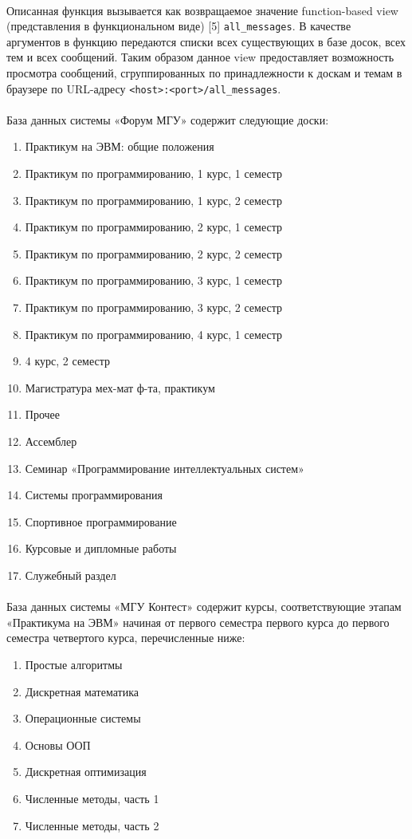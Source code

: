 \documentclass[12pt, a4paper, oneside]{article}
\begin{document}
\paragraph{}
Описанная функция вызывается как возвращаемое значение function-based view (представления в функциональном виде) [5] \texttt{all\_messages}. В качестве аргументов в функцию передаются списки всех существующих в базе досок, всех тем и всех сообщений. Таким образом данное view предоставляет возможность просмотра сообщений, сгруппированных по принадлежности к доскам и темам в браузере по URL-адресу \texttt{<host>:<port>/all\_messages}.
\paragraph{}
База данных системы «Форум МГУ» содержит следующие доски:
\begin{enumerate}
    \item Практикум на ЭВМ: общие положения
    \item Практикум по программированию, 1 курс, 1 семестр
    \item Практикум по программированию, 1 курс, 2 семестр
    \item Практикум по программированию, 2 курс, 1 семестр
    \item Практикум по программированию, 2 курс, 2 семестр
    \item Практикум по программированию, 3 курс, 1 семестр
    \item Практикум по программированию, 3 курс, 2 семестр
    \item Практикум по программированию, 4 курс, 1 семестр
    \item 4 курс, 2 семестр
    \item Магистратура мех-мат ф-та, практикум
    \item Прочее
    \item Ассемблер
    \item Семинар «Программирование интеллектуальных систем»
    \item Системы программирования
    \item Спортивное программирование
    \item Курсовые и дипломные работы
    \item Служебный раздел
\end{enumerate}
\paragraph{}
База данных системы «МГУ Контест» содержит курсы, соответствующие этапам «Практикума на ЭВМ» начиная от первого семестра первого курса до первого семестра четвертого курса, перечисленные ниже:
\begin{enumerate}
    \item Простые алгоритмы
    \item Дискретная математика
    \item Операционные системы
    \item Основы ООП
    \item Дискретная оптимизация
    \item Численные методы, часть 1
    \item Численные методы, часть 2
\end{enumerate}
\end{document}
